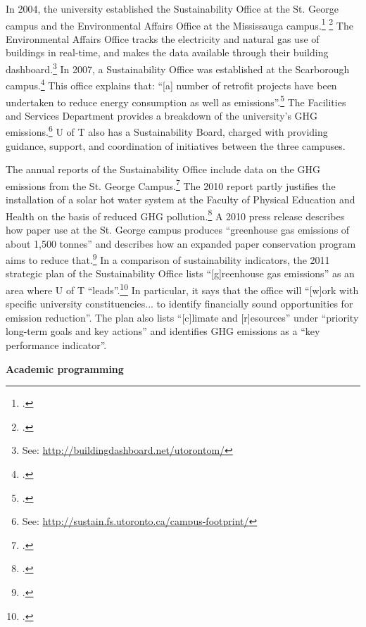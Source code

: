 \documentclass[10pt]{article}
\begin{document}
In 2004, the university established the Sustainability Office at the St. George campus and the Environmental Affairs Office at the Mississauga campus.\footcite[][]{UTSustOffice} \footcite[][]{UTEAOffice}
The Environmental Affairs Office tracks the electricity and natural gas use of buildings in real-time, and makes the data available through their building dashboard.\footnote{See: \url{http://buildingdashboard.net/utorontom/}}
In 2007, a Sustainability Office was established at the Scarborough campus.\footcite[See: ][]{UTSustOffice}
This office explains that: ``[a] number of retrofit projects have been undertaken to reduce energy consumption as well as  emissions''.\footcite[][]{UTSustOfficeEnergy}
The Facilities and Services Department provides a breakdown of the university's GHG emissions.\footnote{See: \url{http://sustain.fs.utoronto.ca/campus-footprint/}}
U of T also has a Sustainability Board, charged with providing guidance, support, and coordination of initiatives between the three campuses.



The annual reports of the Sustainability Office include data on the GHG emissions from the St. George Campus.\footcite[][]{UTSustOffice2010report}
The 2010 report partly justifies the installation of a solar hot water system at the Faculty of Physical Education and Health on the basis of reduced GHG pollution.\footcite[][p. 17]{UTSustOffice2010report}
A 2010 press release describes how paper use at the St. George campus produces ``greenhouse gas emissions of about 1,500 tonnes'' and describes how an expanded paper conservation program aims to reduce that.\footcite[][]{UTGoingGreener2010}
In a comparison of sustainability indicators, the 2011 strategic plan of the Sustainability Office lists ``[g]reenhouse gas emissions'' as an area where U of T ``leads''.\footcite[][p. 1]{UTSustOfficePlan}
In particular, it says that the office will ``[w]ork with specific university constituencies... to identify financially sound opportunities for emission reduction''.
The plan also lists ``[c]limate and [r]esources'' under ``priority long-term goals and key actions'' and identifies GHG emissions as a ``key performance indicator''.




\textbf{Academic programming}
\label{UofTAcademicProgramming}
\end{document}

